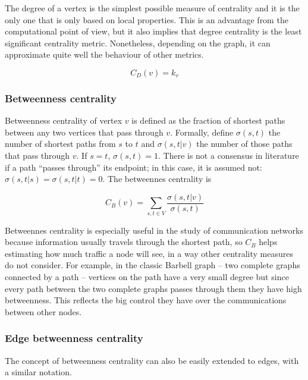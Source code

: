 \documentclass[oneside,openany]{memoir}
\begin{document}
The degree of a vertex is the simplest possible measure of centrality
and it is the only one that is only based on local properties. This is
an advantage from the computational point of view, but it also implies
that degree centrality is the least significant centrality metric.
Nonetheless, depending on the graph, it can approximate quite well the
behaviour of other metrics.

\begin{equation}
C_D(v) = k_v
\end{equation}

\subsubsection{Betweenness centrality}\label{betweenness-centrality}

Betweenness centrality of vertex $v$ is defined as the fraction of
shortest paths between any two vertices that pass through $v$. Formally,
define $\sigma(s,t)$ the number of shortest paths from $s$ to $t$ and
$\sigma(s,t|v)$ the number of those paths that pass through $v$. If
$s = t,\, \sigma(s,t) = 1$. There is not a consensus in literature if a
path ``passes through'' its endpoint; in this case, it is assumed not:
$\sigma(s,t|s) = \sigma(s,t|t) = 0$. The betweennes centrality is

\begin{equation}
C_B(v) = \sum_{s,t \in V} \frac{\sigma(s,t|v)}{\sigma(s,t)} %
\end{equation}

Betweennes centrality is especially useful in the study of communication
networks because information usually travels through the shortest path,
so $C_B$ helps estimating how much traffic a node will see, in a way
other centrality measures do not consider. For example, in the classic
Barbell graph -- two complete graphs connected by a path -- vertices on
the path have a very small degree but since every path between the two
complete graphs passes through them they have high betweenness. This
reflects the big control they have over the communications between other
nodes.

\subsubsection{Edge betweenness
centrality}\label{edge-betweenness-centrality}

The concept of betweenness centrality can also be easily extended to
edges, with a similar notation.
\end{document}

